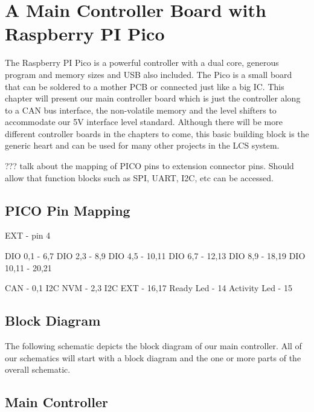 \chapter{A Main Controller Board with Raspberry PI Pico}

The Raspberry PI Pico is a powerful controller with a dual core, generous program and memory sizes and USB also included. The Pico is a small board that can be soldered to a mother PCB or connected just like a big IC. This chapter will present our main controller board which is just the controller along to a CAN bus interface, the non-volatile memory and the level shifters to accommodate our 5V interface level standard. Although there will be more different controller boards in the chapters to come, this basic building block is the generic heart and can be used for many other projects in the LCS system.


??? talk about the mapping of PICO pins to extension connector pins. Should allow that function blocks such as SPI, UART, I2C, etc can be accessed.

\section{PICO Pin Mapping}

EXT             - pin 4

DIO 0,1         - 6,7
DIO 2,3         - 8,9
DIO 4,5         - 10,11
DIO 6,7         - 12,13
DIO 8,9         - 18,19
DIO 10,11       - 20,21

CAN             - 0,1
I2C NVM         - 2,3
I2C EXT         - 16,17
Ready Led       - 14
Activity Led    - 15


\section{Block Diagram}

The following schematic depicts the block diagram of our main controller. All of our schematics will start with a block diagram and the one or more parts of the overall schematic.


\section{Main Controller}

